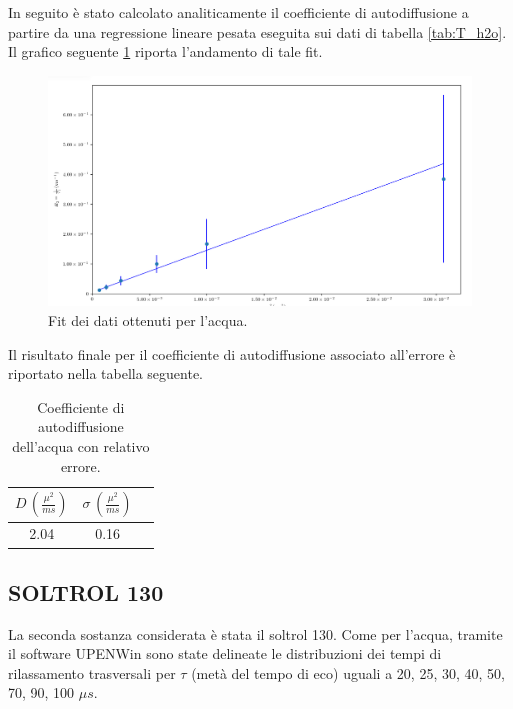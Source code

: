 In seguito è stato calcolato analiticamente il coefficiente di autodiffusione a partire da una regressione lineare pesata eseguita sui dati di tabella \ref{tab:T_h2o}.
Il grafico seguente \ref{fig:Df_h2o} riporta l'andamento di tale fit.

\begin{figure}[ht]
\centering
\includegraphics[width=\columnwidth]{Figure/H2O_calc.png}
\caption{Fit dei dati ottenuti per l'acqua.}
\label{fig:Df_h2o}
\end{figure}

Il risultato finale per il coefficiente di autodiffusione associato all'errore è riportato nella tabella seguente.

\begin{table}[ht]
    \begin{center}
    \begin{tabular}{c c c}
    \toprule
    	$D\,(\frac{{\mu}^2}{ms})$ & $\sigma\,(\frac{{\mu}^2}{ms})$ \\
    \midrule
    	2.04	&	0.16	\\
    \bottomrule
    \end{tabular}
    \caption{Coefficiente di autodiffusione dell'acqua con relativo errore.}
    \label{tab:Df_h2o}
    \end{center}
\end{table}


\subsection*{SOLTROL 130}

La seconda sostanza considerata è stata il soltrol 130.
Come per l'acqua, tramite il software UPENWin sono state delineate le distribuzioni dei tempi di rilassamento trasversali per $\tau$ (metà del tempo di eco) uguali a 20, 25, 30, 40, 50, 70, 90, 100 ${\mu}s$.

